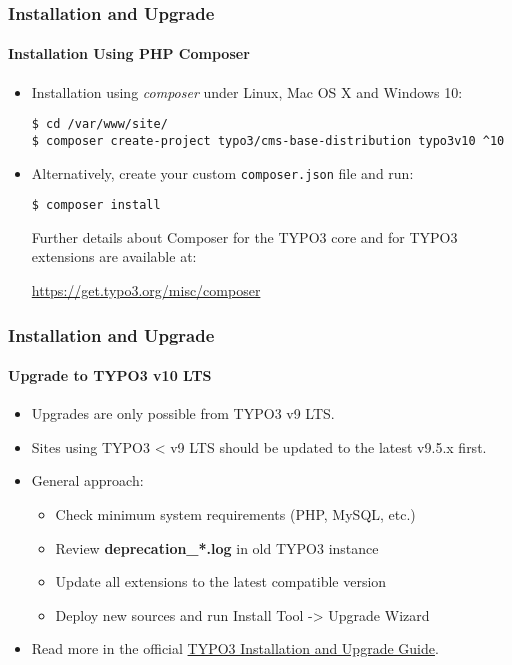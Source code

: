 
\begin{frame}[fragile]
	\frametitle{Installation and Upgrade}
	\framesubtitle{Installation Using PHP Composer}

	\begin{itemize}
		\item Installation using \textit{composer} under Linux, Mac OS X and Windows 10:
\begin{lstlisting}
$ cd /var/www/site/
$ composer create-project typo3/cms-base-distribution typo3v10 ^10
\end{lstlisting}

		\item Alternatively, create your custom \texttt{composer.json} file and run:
\begin{lstlisting}
$ composer install
\end{lstlisting}

		Further details about Composer for the TYPO3 core and for TYPO3 extensions
		are available at:

		\small
			\href{https://get.typo3.org/misc/composer/}{https://get.typo3.org/misc/composer}
		\normalsize

	\end{itemize}
\end{frame}


\begin{frame}[fragile]
	\frametitle{Installation and Upgrade}
	\framesubtitle{Upgrade to TYPO3 v10 LTS}

	\begin{itemize}
		\item Upgrades are only possible from TYPO3 v9 LTS.
		\item Sites using TYPO3 < v9 LTS should be updated to the latest v9.5.x first.
	\end{itemize}

	\begin{itemize}
		\item General approach:
			\begin{itemize}
				\item Check minimum system requirements \small(PHP, MySQL, etc.)
				\item Review \textbf{deprecation\_*.log} in old TYPO3 instance
				\item Update all extensions to the latest compatible version
				\item Deploy new sources and run Install Tool -> Upgrade Wizard
			\end{itemize}
		\item Read more in the official
			\href{https://docs.typo3.org/m/typo3/guide-installation/master/en-us/Upgrade/Index.html}{TYPO3 Installation and Upgrade Guide}.

	\end{itemize}

\end{frame}

